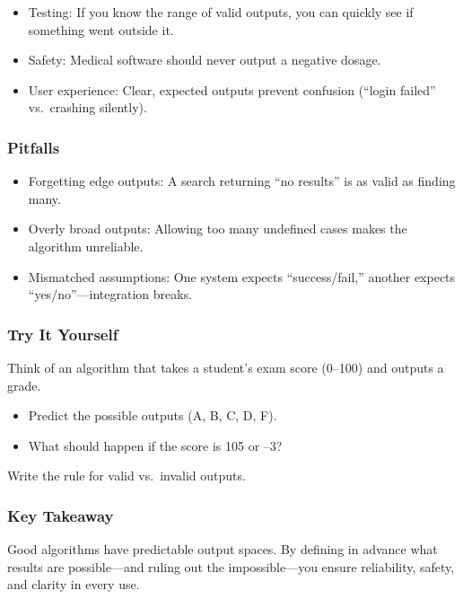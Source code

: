 \documentclass[
  letterpaper,
  DIV=11,
  numbers=noendperiod]{scrreprt}
\providecommand{\tightlist}{%
  \setlength{\itemsep}{0pt}\setlength{\parskip}{0pt}}
\begin{document}
\begin{itemize}
\tightlist
\item
  Testing: If you know the range of valid outputs, you can quickly see
  if something went outside it.
\item
  Safety: Medical software should never output a negative dosage.
\item
  User experience: Clear, expected outputs prevent confusion (``login
  failed'' vs.~crashing silently).
\end{itemize}

\subsubsection{Pitfalls}\label{pitfalls-14}

\begin{itemize}
\tightlist
\item
  Forgetting edge outputs: A search returning ``no results'' is as valid
  as finding many.
\item
  Overly broad outputs: Allowing too many undefined cases makes the
  algorithm unreliable.
\item
  Mismatched assumptions: One system expects ``success/fail,'' another
  expects ``yes/no''---integration breaks.
\end{itemize}

\subsubsection{Try It Yourself}\label{try-it-yourself-17}

Think of an algorithm that takes a student's exam score (0--100) and
outputs a grade.

\begin{itemize}
\tightlist
\item
  Predict the possible outputs (A, B, C, D, F).
\item
  What should happen if the score is 105 or --3?
\end{itemize}

Write the rule for valid vs.~invalid outputs.

\subsubsection{Key Takeaway}\label{key-takeaway-16}

Good algorithms have predictable output spaces. By defining in advance
what results are possible---and ruling out the impossible---you ensure
reliability, safety, and clarity in every use.
\end{document}
